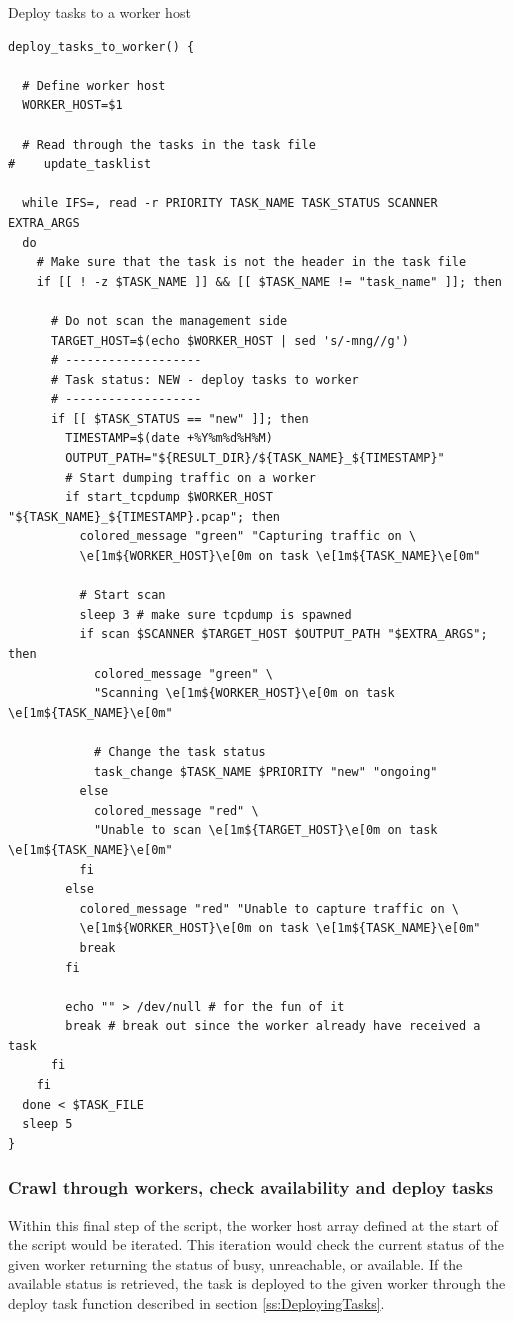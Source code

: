 \begin{listing}[!ht]
\caption{Deploy tasks to a worker host}
\label{lst:DeployTaskWorker}
\begin{verbatim}
deploy_tasks_to_worker() {

  # Define worker host
  WORKER_HOST=$1

  # Read through the tasks in the task file
#    update_tasklist

  while IFS=, read -r PRIORITY TASK_NAME TASK_STATUS SCANNER EXTRA_ARGS
  do
    # Make sure that the task is not the header in the task file
    if [[ ! -z $TASK_NAME ]] && [[ $TASK_NAME != "task_name" ]]; then

      # Do not scan the management side
      TARGET_HOST=$(echo $WORKER_HOST | sed 's/-mng//g')
      # -------------------
      # Task status: NEW - deploy tasks to worker
      # -------------------
      if [[ $TASK_STATUS == "new" ]]; then
        TIMESTAMP=$(date +%Y%m%d%H%M)
        OUTPUT_PATH="${RESULT_DIR}/${TASK_NAME}_${TIMESTAMP}"
        # Start dumping traffic on a worker
        if start_tcpdump $WORKER_HOST "${TASK_NAME}_${TIMESTAMP}.pcap"; then
          colored_message "green" "Capturing traffic on \
          \e[1m${WORKER_HOST}\e[0m on task \e[1m${TASK_NAME}\e[0m"

          # Start scan
          sleep 3 # make sure tcpdump is spawned
          if scan $SCANNER $TARGET_HOST $OUTPUT_PATH "$EXTRA_ARGS"; then
            colored_message "green" \
            "Scanning \e[1m${WORKER_HOST}\e[0m on task \e[1m${TASK_NAME}\e[0m"

            # Change the task status
            task_change $TASK_NAME $PRIORITY "new" "ongoing"
          else
            colored_message "red" \
            "Unable to scan \e[1m${TARGET_HOST}\e[0m on task \e[1m${TASK_NAME}\e[0m"
          fi
        else
          colored_message "red" "Unable to capture traffic on \
          \e[1m${WORKER_HOST}\e[0m on task \e[1m${TASK_NAME}\e[0m"
          break
        fi

        echo "" > /dev/null # for the fun of it
        break # break out since the worker already have received a task
      fi
    fi
  done < $TASK_FILE
  sleep 5
}
\end{verbatim}
\end{listing}


\subsubsection{Crawl through workers, check availability and deploy tasks}
\label{ss:CrawlThroughWorkers}
Within this final step of the script, the worker host array defined at the start of the script would be iterated.
This iteration would check the current status of the given worker returning the status of busy, unreachable, or available.
If the available status is retrieved, the task is deployed to the given worker through the deploy task function described in section \ref{ss:DeployingTasks}.

